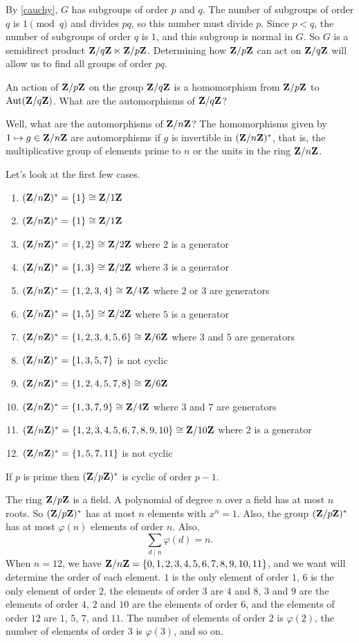\documentclass[11pt, twoside]{amsart}
\begin{document}
By \cref{cauchy}, $G$ has subgroups of order $p$ and $q$. The number of subgroups of order $q$ is $1\pmod q$ and divides $pq$, so this number must divide $p$. Since $p<q$, the number of subgroups of order $q$ is $1$, and this subgroup is normal in $G$. So $G$ is a semidirect product $\mathbf{Z}/q\mathbf{Z} \ltimes \mathbf{Z}/p\mathbf{Z}$. Determining how $\mathbf{Z}/p\mathbf{Z}$ can act on $\mathbf{Z}/q\mathbf{Z}$ will allow us to find all groups of order $pq$. 

An action of $\mathbf{Z}/p\mathbf{Z}$ on the group $\mathbf{Z}/q\mathbf{Z}$ is a homomorphism from $\mathbf{Z}/p\mathbf{Z}$ to $\operatorname{Aut}(\mathbf{Z}/q\mathbf{Z})$. What are the automorphisms of $\mathbf{Z}/q\mathbf{Z}$? 

Well, what are the automorphisms of $\mathbf{Z}/n\mathbf{Z} $? The homomorphisms given by $1\mapsto g \in \mathbf{Z}/n\mathbf{Z}$ are automorphisms if $g$ is invertible in $(\mathbf{Z}/n\mathbf{Z})^*$, that is, the multiplicative group of elements prime to $n$ or the units in the ring $\mathbf{Z}/n\mathbf{Z}$. 

Let's look at the first few cases. 
\begin{enumerate}
\item $(\mathbf{Z}/n\mathbf{Z} )^* = \{1\} \cong \mathbf{Z}/1\mathbf{Z}$
\item $(\mathbf{Z}/n\mathbf{Z} )^* = \{1\} \cong \mathbf{Z}/1\mathbf{Z} $
\item $(\mathbf{Z}/n\mathbf{Z} )^* = \{1,2\}\cong \mathbf{Z}/2\mathbf{Z} $ where $2$ is a generator
\item $(\mathbf{Z}/n\mathbf{Z} )^* = \{1,3\}\cong \mathbf{Z}/2\mathbf{Z} $ where $3$ is a generator
\item $(\mathbf{Z}/n\mathbf{Z} )^* = \{1,2,3,4\}\cong \mathbf{Z}/4\mathbf{Z} $ where $2$ or $3$ are generators
\item $(\mathbf{Z}/n\mathbf{Z} )^* = \{1,5\}\cong \mathbf{Z}/2\mathbf{Z}$ where $5$ is a generator
\item $(\mathbf{Z}/n\mathbf{Z} )^* = \{1,2,3,4,5,6\}\cong \mathbf{Z}/6\mathbf{Z}$ where $3$ and $5$ are generators
\item $(\mathbf{Z}/n\mathbf{Z} )^* = \{1,3,5,7\}$ is not cyclic 
\item $(\mathbf{Z}/n\mathbf{Z} )^* = \{1,2,4,5,7,8\}\cong \mathbf{Z}/6\mathbf{Z}$
\item $(\mathbf{Z}/n\mathbf{Z} )^* = \{1,3,7,9\}\cong \mathbf{Z}/4\mathbf{Z}$ where $3$ and $7$ are generators
\item $(\mathbf{Z}/n\mathbf{Z} )^* = \{1,2,3,4,5,6,7,8,9,10\}\cong \mathbf{Z}/{10}\mathbf{Z}$ where $2$ is a generator
\item $(\mathbf{Z}/n\mathbf{Z} )^* = \{1,5,7, 11\}$ is not cyclic
\end{enumerate}

\begin{proposition}
If $p$ is prime then $(\mathbf{Z}/p\mathbf{Z})^*$ is cyclic of order $p-1$.
\end{proposition}


The ring $\mathbf{Z}/p\mathbf{Z}$ is a field. A polynomial of degree $n$ over a field has at most $n$ roots. So $(\mathbf{Z}/p\mathbf{Z})^*$ has at most $n$ elements with $x^n = 1$. Also, the group $(\mathbf{Z}/p\mathbf{Z})^*$ has at most $\varphi(n)$ elements of order $n$. Also, 
$$
\sum_{d\mid n} \varphi(d) = n.
$$
When $n=12$, we have $\mathbf{Z}/n\mathbf{Z}  = \{0,1,2,3,4,5,6,7,8,9,10,11\}$, and we want will determine the order of each element. $1$ is the only element of order $1$, $6$ is the only element of order $2$, the elements of order $3$ are $4$ and $8$, $3$ and $9$ are the elements of order $4$, $2$ and $10$ are the elements of order $6$, and the elements of order $12$ are $1$, $5$, $7$, and $11$. The number of elements of order $2$ is $\varphi(2)$, the number of elements of order $3$ is $\varphi(3)$, and so on. 
\end{document}
